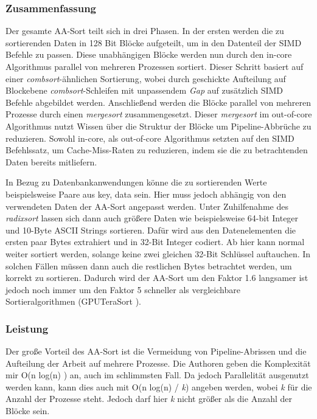 \subsubsection*{Zusammenfassung}
\label{sec:AA-Sort_Zusammenfassung}

Der gesamte AA-Sort teilt sich in drei Phasen. In der ersten werden die zu sortierenden Daten in 128 Bit Blöcke aufgeteilt, um in den Datenteil der SIMD Befehle zu passen. Diese unabhängigen Blöcke werden nun durch den in-core Algorithmus parallel von mehreren Prozessen sortiert. Dieser Schritt basiert auf einer \textit{combsort}-ähnlichen Sortierung, wobei durch geschickte Aufteilung auf Blockebene \textit{combsort}-Schleifen mit unpassendem \textit{Gap} auf zusätzlich SIMD Befehle abgebildet werden. Anschließend werden die Blöcke parallel von mehreren Prozesse durch einen \textit{mergesort} zusammengesetzt. Dieser \textit{mergesort} im out-of-core Algorithmus nutzt Wissen über die Struktur der Blöcke um Pipeline-Abbrüche zu reduzieren. Sowohl in-core, als out-of-core Algorithmus setzten auf den SIMD Befehlssatz, um Cache-Miss-Raten zu reduzieren, indem sie die zu betrachtenden Daten bereits mitliefern.

In Bezug zu Datenbankanwendungen könne die zu sortierenden Werte beispielsweise Paare aus {key, data} sein. Hier muss jedoch abhängig von den verwendeten Daten der AA-Sort angepasst werden. Unter Zuhilfenahme des \textit{radixsort} lassen sich dann auch größere Daten wie beispielsweise 64-bit Integer und 10-Byte ASCII Strings sortieren. Dafür wird aus den Datenelementen die ersten paar Bytes extrahiert und in 32-Bit Integer codiert. Ab hier kann normal weiter sortiert werden, solange keine zwei gleichen 32-Bit Schlüssel auftauchen. In solchen Fällen müssen dann auch die restlichen Bytes betrachtet werden, um korrekt zu sortieren. Dadurch wird der AA-Sort um den Faktor 1.6 langsamer ist jedoch noch immer um den Faktor 5 schneller als vergleichbare Sortieralgorithmen (GPUTeraSort \cite{GOVINDARAJU}).

\subsubsection*{Leistung}
\label{sec:AA-Sort_Leistung}

Der große Vorteil des AA-Sort ist die Vermeidung von Pipeline-Abrissen und die Aufteilung der Arbeit auf mehrere Prozesse. Die Authoren \cite{INOUE} geben die Komplexität mir O(n log(n) ) an, auch im schlimmsten Fall. Da jedoch Parallelität ausgenutzt werden kann, kann dies auch mit O(n log(n) / \textit{k}) angeben werden, wobei \textit{k} für die Anzahl der Prozesse steht. Jedoch darf hier \textit{k} nicht größer als die Anzahl der Blöcke sein. 

